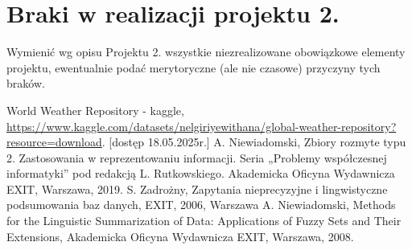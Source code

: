 \documentclass{article}
\begin{document}
\section{Braki w realizacji projektu 2.}
Wymienić wg opisu Projektu 2. wszystkie niezrealizowane obowiązkowe elementy projektu, ewentualnie
podać merytoryczne (ale nie czasowe) przyczyny tych braków. 


\begin{thebibliography}{99}
 World Weather Repository - kaggle, \url{https://www.kaggle.com/datasets/nelgiriyewithana/global-weather-repository?resource=download}. [dostęp 18.05.2025r.]
  A. Niewiadomski, Zbiory rozmyte typu 2. Zastosowania w reprezentowaniu informacji.  Seria „Problemy współczesnej informatyki” pod redakcją L. Rutkowskiego. Akademicka Oficyna Wydawnicza EXIT, Warszawa, 2019.
 S. Zadrożny, Zapytania nieprecyzyjne i lingwistyczne podsumowania baz danych, EXIT, 2006, Warszawa
 A. Niewiadomski, Methods for the Linguistic Summarization of Data: Applications of Fuzzy Sets and Their Extensions, Akademicka Oficyna Wydawnicza EXIT, Warszawa, 2008.
\end{thebibliography}
\end{document}
